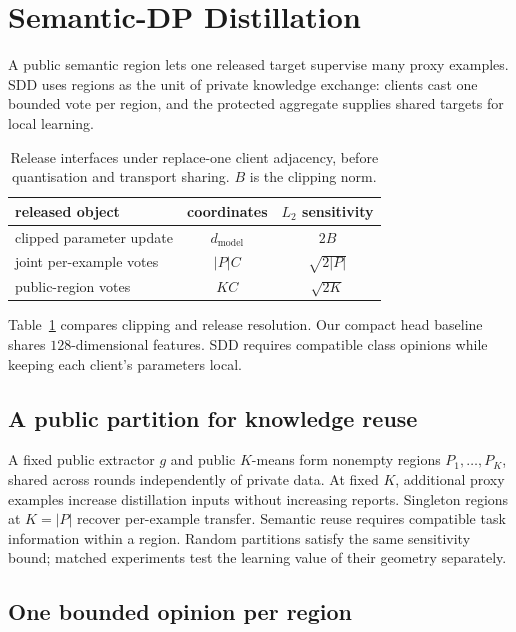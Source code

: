 \section{Semantic-DP Distillation}
\label{sec:method}

A public semantic region lets one released target supervise many proxy
examples. SDD uses regions as the unit of private knowledge exchange:
clients cast one bounded vote per region, and the protected aggregate supplies
shared targets for local learning.

\begin{table}[t]
\caption{Release interfaces under replace-one client adjacency, before
quantisation and transport sharing. $B$ is the clipping norm.}
\label{tab:release-interfaces}\small
\begin{tabular}{@{}lcc@{}}\toprule
released object & coordinates & $L_2$ sensitivity \\\midrule
clipped parameter update & $d_{\mathrm{model}}$ & $2B$ \\
joint per-example votes & $|P|C$ & $\sqrt{2|P|}$ \\
public-region votes & $KC$ & $\sqrt{2K}$ \\
\bottomrule\end{tabular}
\end{table}

Table~\ref{tab:release-interfaces} compares clipping and release resolution.
Our compact head baseline shares $128$-dimensional features. SDD requires
compatible class opinions while keeping each client's parameters local.

\subsection{A public partition for knowledge reuse}
\label{sec:method:cluster}

A fixed public extractor $g$ and public $K$-means form nonempty regions
$P_1,\ldots,P_K$, shared across rounds independently of private data.
At fixed $K$, additional proxy examples increase distillation inputs without
increasing reports. Singleton regions at $K=|P|$ recover per-example transfer.
Semantic reuse requires compatible task information within a region. Random
partitions satisfy the same sensitivity bound; matched experiments test the
learning value of their geometry separately.

\subsection{One bounded opinion per region}
\label{sec:method:report}

